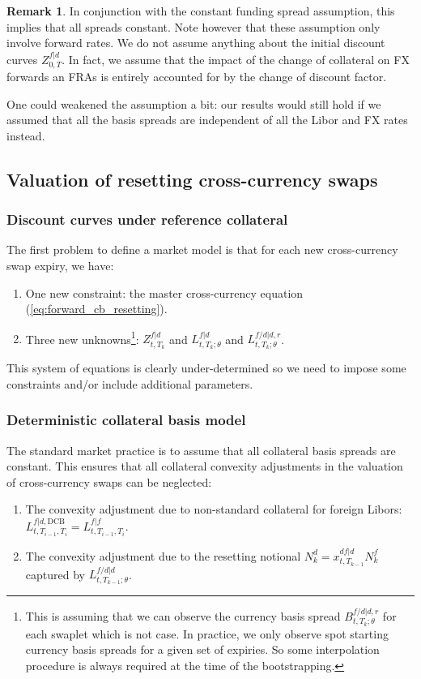 \documentclass[11pt,english]{amsart}
\newcommand{\DCB}{\mathrm{DCB}}
\theoremstyle{definition}
\newtheorem{rema}{Remark}
\begin{document}
\begin{rema}
In conjunction with the constant funding spread assumption, this implies that all spreads constant. Note however that these assumption only involve forward rates. We do not assume anything about the initial discount curves $Z^{f|d}_{0,T}$. In fact, we assume that the impact of the change of collateral on FX forwards an FRAs is entirely accounted for by the change of discount factor.  

One could weakened the assumption a bit: our results would still hold if we assumed that all the basis spreads are independent of all the Libor and FX rates instead. 
\end{rema}

\subsection{Valuation of resetting cross-currency swaps}%

\subsubsection{Discount curves under reference collateral}
The first problem to define a market model is that for each new cross-currency swap expiry, we have:
\begin{enumerate}
\item One new constraint: the master cross-currency equation (\ref{eq:forward_cb_resetting}).
\item Three new unknowns\footnote{This is assuming that we can observe the currency basis spread $B^{f/d|d,r}_{t,T_{k};\theta}$ for each swaplet which is not case. In practice, we only observe spot starting currency basis spreads for a given set of expiries. So some interpolation procedure is always required at the time of the bootstrapping.}: $Z^{f|d}_{t,T_{k}}$ and $L^{f|d}_{t,T_{k};\theta}$ and $L^{f/d|d,r}_{t,T_{k};\theta}$. 
\end{enumerate}
This system of equations is clearly under-determined so we need to impose some constraints and/or include additional parameters.


\subsubsection{Deterministic collateral basis model}
The standard market practice is to assume that all collateral basis spreads are constant. This ensures that all collateral convexity adjustments in the valuation of cross-currency swaps can be neglected:
\begin{enumerate}
\item The convexity adjustment due to non-standard collateral for foreign Libors: $L^{f|d,\DCB}_{t,T_{i-1},T_i} = L^{f|f}_{t,T_{i-1},T_i}$.
\item The convexity adjustment due to the resetting notional $N^d_k = x^{df|d}_{t,T_{k-1}}N^f_k$ captured by $L^{f/d|d}_{t,T_{k-1};\theta}$. 
\end{enumerate}
\end{document}
